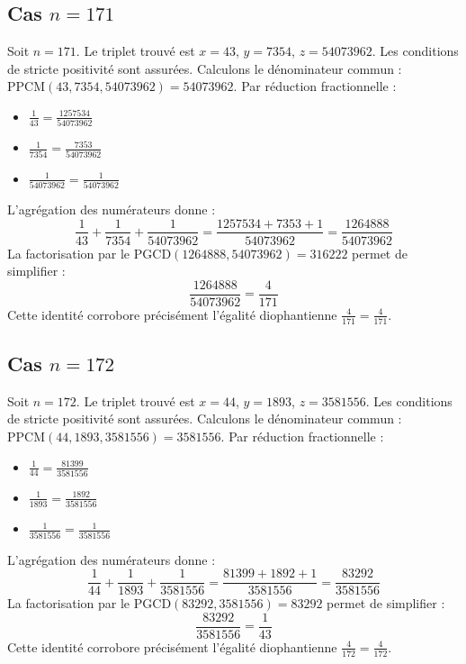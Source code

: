 \documentclass[11pt,a4paper]{article}
\begin{document}
\subsection{Cas $n = 171$}
Soit $n = 171$. Le triplet trouvé est $x = 43$, $y = 7354$, $z = 54073962$.
Les conditions de stricte positivité sont assurées.
Calculons le dénominateur commun : $\text{PPCM}(43, 7354, 54073962) = 54073962$.
Par réduction fractionnelle :
\begin{itemize}
    \item $\frac{1}{43} = \frac{1257534}{54073962}$
    \item $\frac{1}{7354} = \frac{7353}{54073962}$
    \item $\frac{1}{54073962} = \frac{1}{54073962}$
\end{itemize}
L'agrégation des numérateurs donne :
$$ \frac{1}{43} + \frac{1}{7354} + \frac{1}{54073962} = \frac{1257534 + 7353 + 1}{54073962} = \frac{1264888}{54073962} $$
La factorisation par le $\text{PGCD}(1264888, 54073962) = 316222$ permet de simplifier :
$$ \frac{1264888}{54073962} = \frac{4}{171} $$
Cette identité corrobore précisément l'égalité diophantienne $\frac{4}{171} = \frac{4}{171}$.

\subsection{Cas $n = 172$}
Soit $n = 172$. Le triplet trouvé est $x = 44$, $y = 1893$, $z = 3581556$.
Les conditions de stricte positivité sont assurées.
Calculons le dénominateur commun : $\text{PPCM}(44, 1893, 3581556) = 3581556$.
Par réduction fractionnelle :
\begin{itemize}
    \item $\frac{1}{44} = \frac{81399}{3581556}$
    \item $\frac{1}{1893} = \frac{1892}{3581556}$
    \item $\frac{1}{3581556} = \frac{1}{3581556}$
\end{itemize}
L'agrégation des numérateurs donne :
$$ \frac{1}{44} + \frac{1}{1893} + \frac{1}{3581556} = \frac{81399 + 1892 + 1}{3581556} = \frac{83292}{3581556} $$
La factorisation par le $\text{PGCD}(83292, 3581556) = 83292$ permet de simplifier :
$$ \frac{83292}{3581556} = \frac{1}{43} $$
Cette identité corrobore précisément l'égalité diophantienne $\frac{4}{172} = \frac{4}{172}$.
\end{document}
